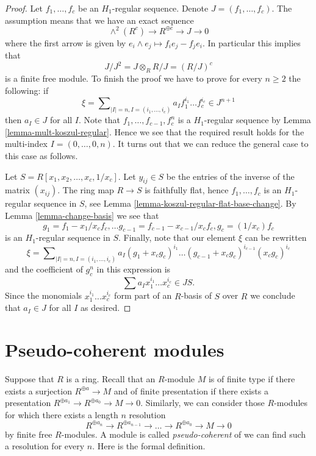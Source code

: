 \begin{proof}
Let $f_1, \ldots, f_c$ be an $H_1$-regular sequence.
Denote $J = (f_1, \ldots, f_c)$. The assumption means that we have
an exact sequence
$$
\wedge^2(R^c) \to R^{\oplus c} \to J \to 0
$$
where the first arrow is given by $e_i \wedge e_j \mapsto f_ie_j - f_je_i$.
In particular this implies that
$$
J/J^2 = J \otimes_R R/J = (R/J)^c
$$
is a finite free module. To finish the proof we have to prove
for every $n \geq 2$ the following: if
$$
\xi = \sum\nolimits_{|I| = n, I = (i_1, \ldots, i_c)}
a_I f_1^{i_1} \ldots f_c^{i_c} \in J^{n + 1}
$$
then $a_I \in J$ for all $I$. Note that $f_1, \ldots, f_{c - 1}, f_c^n$
is a $H_1$-regular sequence by
Lemma \ref{lemma-mult-koszul-regular}.
Hence we see that the required result holds for
the multi-index $I = (0, \ldots, 0, n)$. It turns out that we can
reduce the general case to this case as follows.

\medskip\noindent
Let $S = R[x_1, x_2, \ldots, x_c, 1/x_c]$.
Let $y_{ij} \in S$ be the entries of the inverse of the matrix $(x_{ij})$.
The ring map $R \to S$ is faithfully
flat, hence $f_1, \ldots, f_c$ is an $H_1$-regular sequence in $S$, see
Lemma \ref{lemma-koszul-regular-flat-base-change}.
By
Lemma \ref{lemma-change-basis}
we see that
$$
g_1 = f_1 - x_1/x_c f_c, \ldots
g_{c - 1} = f_{c - 1} - x_{c - 1}/x_c f_c,
g_c = (1/x_c)f_c
$$
is an $H_1$-regular sequence in $S$. Finally, note that our element
$\xi$ can be rewritten
$$
\xi = \sum\nolimits_{|I| = n, I = (i_1, \ldots, i_c)}
a_I (g_1 + x_c g_c)^{i_1} \ldots (g_{c - 1} + x_c g_c)^{i_{c - 1}}
(x_cg_c)^{i_c}
$$
and the coefficient of $g_c^n$ in this expression is
$$
\sum a_I x_1^{i_1} \ldots x_c^{i_c} \in JS.
$$
Since the monomials $x_1^{i_1} \ldots x_c^{i_c}$ form part of an $R$-basis
of $S$ over $R$ we conclude that $a_I \in J$ for all $I$ as desired.
\end{proof}






\section{Pseudo-coherent modules}
\label{section-pseudo-coherent}

\noindent
Suppose that $R$ is a ring. Recall that an $R$-module $M$ is of finite type
if there exists a surjection $R^{\oplus a} \to M$ and of finite presentation
if there exists a presentation
$R^{\oplus a_1} \to R^{\oplus a_0} \to M \to 0$.
Similarly, we can consider those $R$-modules for which there exists
a length $n$ resolution
\begin{equation}
\label{equation-pseudo-coherent}
R^{\oplus a_n} \to R^{\oplus a_{n - 1}} \to \ldots \to R^{\oplus a_0} \to
M \to 0
\end{equation}
by finite free $R$-modules. A module is called {\it pseudo-coherent}
of we can find such a resolution for every $n$. Here is the formal
definition.

